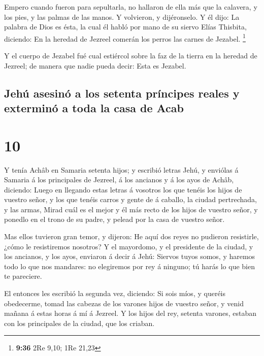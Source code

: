  Empero cuando fueron para sepultarla, no hallaron de ella
más que la calavera, y los pies, y las palmas de las manos.
 Y volvieron, y dijéronselo. Y él dijo: La palabra de Dios
es ésta, la cual él habló por mano de su siervo Elías Thisbita,
diciendo: En la heredad de Jezreel comerán los perros las carnes de
Jezabel. \footnote{\textbf{9:36} 2Re 9,10; 1Re 21,23}

 Y el cuerpo de Jezabel fué cual estiércol sobre la faz de
la tierra en la heredad de Jezreel; de manera que nadie pueda decir:
Esta es Jezabel.

\hypertarget{jehuxfa-asesinuxf3-a-los-setenta-pruxedncipes-reales-y-exterminuxf3-a-toda-la-casa-de-acab}{%
\subsection{Jehú asesinó a los setenta príncipes reales y exterminó a
toda la casa de
Acab}\label{jehuxfa-asesinuxf3-a-los-setenta-pruxedncipes-reales-y-exterminuxf3-a-toda-la-casa-de-acab}}

\hypertarget{section-9}{%
\section{10}\label{section-9}}

 Y tenía Achâb en Samaria setenta hijos; y escribió letras
Jehú, y enviólas á Samaria á los principales de Jezreel, á los ancianos
y á los ayos de Achâb, diciendo:  Luego en llegando estas
letras á vosotros los que tenéis los hijos de vuestro señor, y los que
tenéis carros y gente de á caballo, la ciudad pertrechada, y las armas,
 Mirad cuál es el mejor y él más recto de los hijos de
vuestro señor, y ponedlo en el trono de su padre, y pelead por la casa
de vuestro señor.

 Mas ellos tuvieron gran temor, y dijeron: He aquí dos reyes
no pudieron resistirle, ¿cómo le resistiremos nosotros?  Y
el mayordomo, y el presidente de la ciudad, y los ancianos, y los ayos,
enviaron á decir á Jehú: Siervos tuyos somos, y haremos todo lo que nos
mandares: no elegiremos por rey á ninguno; tú harás lo que bien te
pareciere.

 El entonces les escribió la segunda vez, diciendo: Si sois
míos, y queréis obedecerme, tomad las cabezas de los varones hijos de
vuestro señor, y venid mañana á estas horas á mí á Jezreel. Y los hijos
del rey, setenta varones, estaban con los principales de la ciudad, que
los criaban.

